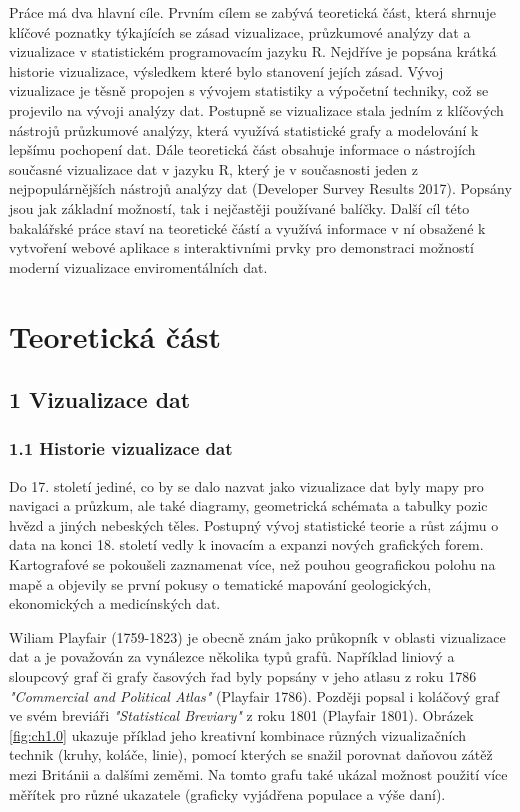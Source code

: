 \documentclass[12pt,]{article}
\begin{document}
\qquad Práce má dva hlavní cíle. Prvním cílem se zabývá teoretická část,
která shrnuje klíčové poznatky týkajících se zásad vizualizace,
průzkumové analýzy dat a vizualizace v statistickém programovacím jazyku
R. Nejdříve je popsána krátká historie vizualizace, výsledkem které bylo
stanovení jejích zásad. Vývoj vizualizace je těsně propojen s vývojem
statistiky a výpočetní techniky, což se projevilo na vývoji analýzy dat.
Postupně se vizualizace stala jedním z klíčových nástrojů průzkumové
analýzy, která využívá statistické grafy a modelování k lepšímu
pochopení dat. Dále teoretická část obsahuje informace o nástrojích
současné vizualizace dat v jazyku R, který je v současnosti jeden z
nejpopulárnějších nástrojů analýzy dat (Developer Survey Results 2017).
Popsány jsou jak základní možností, tak i nejčastěji používané balíčky.
Další cíl této bakalářské práce staví na teoretické částí a využívá
informace v ní obsažené k vytvoření webové aplikace s interaktivními
prvky pro demonstraci možností moderní vizualizace enviromentálních dat.

\newpage

\section*{Teoretická část}\label{teoreticka-cast}

\subsection{1 Vizualizace dat}\label{vizualizace-dat}

\subsubsection{1.1 Historie vizualizace
dat}\label{historie-vizualizace-dat}

\qquad Do 17. století jediné, co by se dalo nazvat jako vizualizace dat
byly mapy pro navigaci a průzkum, ale také diagramy, geometrická
schémata a tabulky pozic hvězd a jiných nebeských těles. Postupný vývoj
statistické teorie a růst zájmu o data na konci 18. století vedly k
inovacím a expanzi nových grafických forem. Kartografové se pokoušeli
zaznamenat více, než pouhou geografickou polohu na mapě a objevily se
první pokusy o tematické mapování geologických, ekonomických a
medicínských dat.

\qquad Wiliam Playfair (1759-1823) je obecně znám jako průkopník v
oblasti vizualizace dat a je považován za vynálezce několika typů grafů.
Například liniový a sloupcový graf či grafy časových řad byly popsány v
jeho atlasu z roku 1786 \textit{"Commercial and Political Atlas"}
(Playfair 1786). Později popsal i koláčový graf ve svém breviáři
\textit{"Statistical Breviary"} z roku 1801 (Playfair 1801). Obrázek
\ref{fig:ch1.0} ukazuje příklad jeho kreativní kombinace různých
vizualizačních technik (kruhy, koláče, linie), pomocí kterých se snažil
porovnat daňovou zátěž mezi Británii a dalšími zeměmi. Na tomto grafu
také ukázal možnost použití více měřítek pro různé ukazatele (graficky
vyjádřena populace a výše daní).
\end{document}

